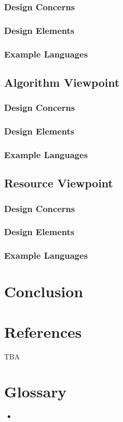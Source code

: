 \documentclass[onecolumn, draftclsnofoot,10pt, compsoc]{IEEEtran}
\begin{document}
\subsubsection{Design Concerns}

\subsubsection{Design Elements}

\subsubsection{Example Languages}

\subsection{Algorithm Viewpoint}
\subsubsection{Design Concerns}

\subsubsection{Design Elements}

\subsubsection{Example Languages}

\subsection{Resource Viewpoint}
\subsubsection{Design Concerns}

\subsubsection{Design Elements}

\subsubsection{Example Languages}

\section{Conclusion}

\section{References}
TBA
\section{Glossary}
\begin{itemize}
    \item 
\end{itemize}
\end{document}
